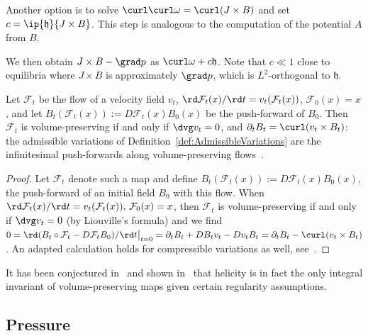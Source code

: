 \documentclass[%
 reprint,
 superscriptaddress,
 amsmath,amssymb,
 aps, nofootinbib, floatfix]{revtex4-2}
\begin{document}
Another option is to solve $\curl \curl \omega = \curl (J \times B)$ and set $c = \ip{\mathfrak h}{J \times B}$. This step is analogous to the computation of the potential $A$ from $B$.   

We then obtain $J \times B - \grad p$ as $\curl \omega + c \mathfrak h$. Note that $c \ll 1$ close to equilibria where $J \times B$ is approximately $\grad p$, which is $L^2$-orthogonal to $\mathfrak h$.

\begin{proposition}
    \label{prop:flow_variations}
    Let $\mathcal F_t$ be the flow of a velocity field $v_t$, $\rd \mathcal F_t(x) / \rd t = v_t(\mathcal F_t(x))$, $\mathcal F_0(x) = x$, and let $B_t(\mathcal F_t(x)) := D\mathcal F_t(x) B_0(x)$ be the push-forward of $B_0$. Then $\mathcal F_t$ is volume-preserving if and only if $\dvg v_t = 0$, and $\partial_t B_t = \curl (v_t \times B_t)$: the admissible variations of Definition~\ref{def:AdmissibleVariations} are the infinitesimal push-forwards along volume-preserving flows~\citep{arnold_topological_2021}.
\end{proposition}
\begin{proof}
    Let $\mathcal F_t$ denote such a map and define $B_t(\mathcal F_t(x)) := D\mathcal F_t(x) B_0(x)$, the push-forward of an initial field $B_0$ with this flow. When ${\rd} \mathcal F_t(x) / {\rd t} = v_t(\mathcal F_t(x)), \, \mathcal F_0(x) = x$, then $\mathcal F_t$ is volume-preserving if and only if $\dvg v_t = 0$ (by Liouville's formula) and we find $0 = \rd ( B_t \circ \mathcal F_t - D\mathcal F_t B_0 ) / {\rd t} \big |_{ t = 0 } = \partial_t B_t + DB_t v_t - Dv_t B_t = \partial_t B_t - \curl (v_t \times B_t)$. An adapted calculation holds for compressible variations as well, see~\citep[Lemma C.1]{enciso_obstructions_2025}.   
\end{proof}

\begin{remark}
    It has been conjectured in~\citep[Section I.9]{arnold_topological_2021} and shown in~\citep{enciso_helicity_2016} that helicity is in fact the only integral invariant of volume-preserving maps given certain regularity assumptions.   
\end{remark}

\subsection{Pressure}
\label{sec:pressure}
    
\end{document}
